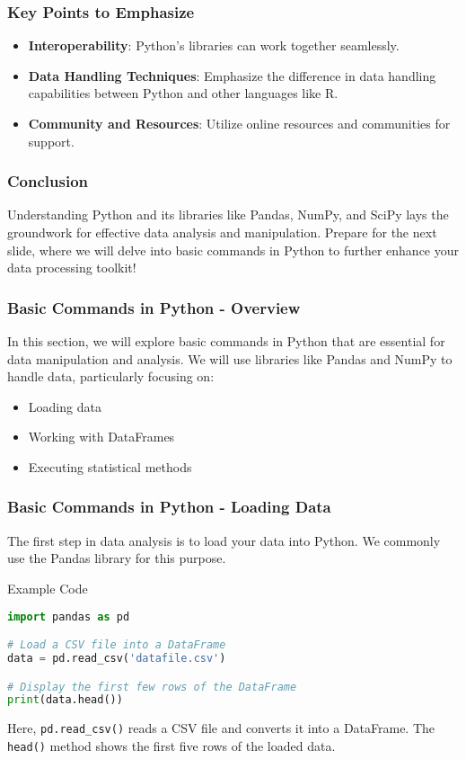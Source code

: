 \documentclass[aspectratio=169]{beamer}
\begin{document}
\begin{frame}
    \frametitle{Key Points to Emphasize}
    \begin{itemize}
        \item \textbf{Interoperability}: Python's libraries can work together seamlessly.
        \item \textbf{Data Handling Techniques}: Emphasize the difference in data handling capabilities between Python and other languages like R.
        \item \textbf{Community and Resources}: Utilize online resources and communities for support.
    \end{itemize}
\end{frame}

\begin{frame}
    \frametitle{Conclusion}
    Understanding Python and its libraries like Pandas, NumPy, and SciPy lays the groundwork for effective data analysis and manipulation. Prepare for the next slide, where we will delve into basic commands in Python to further enhance your data processing toolkit!
\end{frame}

\begin{frame}[fragile]
    \frametitle{Basic Commands in Python - Overview}
    In this section, we will explore basic commands in Python that are essential for data manipulation and analysis. 
    We will use libraries like Pandas and NumPy to handle data, particularly focusing on:
    \begin{itemize}
        \item Loading data
        \item Working with DataFrames
        \item Executing statistical methods
    \end{itemize}
\end{frame}

\begin{frame}[fragile]
    \frametitle{Basic Commands in Python - Loading Data}
    The first step in data analysis is to load your data into Python. 
    We commonly use the Pandas library for this purpose.
    
    \begin{block}{Example Code}
    \begin{lstlisting}[language=Python]
import pandas as pd

# Load a CSV file into a DataFrame
data = pd.read_csv('datafile.csv')

# Display the first few rows of the DataFrame
print(data.head())
    \end{lstlisting}
    \end{block}

    Here, \texttt{pd.read\_csv()} reads a CSV file and converts it into a DataFrame. 
    The \texttt{head()} method shows the first five rows of the loaded data.
\end{frame}
\end{document}
